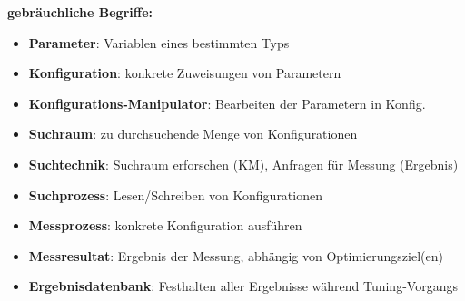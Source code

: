   \begin{frame}
    \textbf{gebräuchliche Begriffe:}
    
  \begin{itemize}

    \item \textbf{Parameter}: Variablen eines bestimmten Typs 
    
    \item \textbf{Konfiguration}: konkrete Zuweisungen von Parametern
    \item \textbf{Konfigurations-Manipulator}: Bearbeiten der Parametern in Konfig. \newline
    
    \item \textbf{Suchraum}: zu durchsuchende Menge von Konfigurationen
    
    \item \textbf{Suchtechnik}: Suchraum erforschen (KM), Anfragen für Messung (Ergebnis)
     
    \item \textbf{Suchprozess}: Lesen/Schreiben von Konfigurationen \newline
    \item \textbf{Messprozess}: konkrete Konfiguration ausführen
    \item \textbf{Messresultat}: Ergebnis der Messung, abhängig von Optimierungsziel(en)
    \item \textbf{Ergebnisdatenbank}: Festhalten aller Ergebnisse während Tuning-Vorgangs
    
  \end{itemize}
  \end{frame}
        
      
